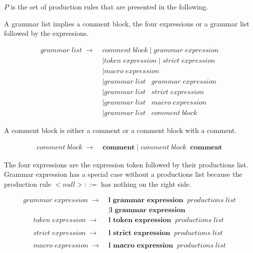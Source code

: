 $P$ is the set of production rules that are presented in the following. 

A grammar list implies a comment block, the four expressions or a grammar list followed by the expressions.

\begin{align*}
	grammar\;list\; \rightarrow\; &comment\;block
	     		\mid grammar\;expression  \\
			   &\mid token\;expression
                \mid strict\;expression\\
               &\mid macro\;expression \\
               &\mid grammar\;list\;\;\;grammar\;expression\\
               &\mid grammar\;list\;\;\;strict\;expression \\
               &\mid grammar\;list\;\;\;macro\;expression \\
               &\mid grammar\;list\;\;\;comment\;block               
\end{align*}

A comment block is either a comment or a comment block with a comment.

\begin{align*}
    comment\;block\; \rightarrow\; &\textbf{comment}
                \mid comment\;block\;\;\textbf{comment}
\end{align*}

The four expressions are the expression token followed by their productions list. Grammar expression has a special case without a productions list because the production rule $ <null> ::= $ has nothing on the right side. 

\begin{align*}
	grammar\;expression\; \rightarrow\; &\textbf{l grammar expression}\;\;productions\;list \\ 
               &\mid \textbf{l grammar expression} 
\end{align*}
\begin{align*}        
	token\;expression\; \rightarrow\; &\textbf{l token expression} \;\;productions\;list \\ \\
	strict\;expression\; \rightarrow\; &\textbf{l strict expression} \;\;productions\;list \\ \\
	macro\;expression\; \rightarrow\; &\textbf{l macro expression} \;\;productions\;list 
\end{align*}


